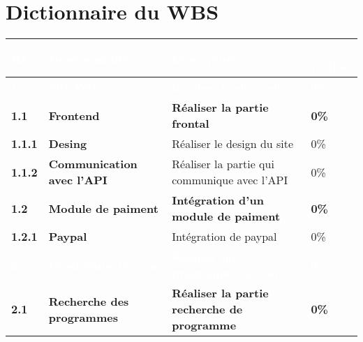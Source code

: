 \section{Dictionnaire du WBS}
\footnotesize
\begin{supertabular}{|p{1.5cm} p{6cm}|p{5cm}|R{2cm}|}
  \hline
  \textcolor{white}{\textbf{ID}} & \textcolor{white}{\textbf{Fonctionnalité}} & \textcolor{white}{\textbf{Description}} & \textcolor{white}{\textbf{\% réalisé}} \\
  \hline
  \hline


  \textcolor{white}{\textbf{1}} & \textcolor{white}{\textbf{Site Web}} & \textcolor{white}{\textbf{Réaliser le site web}} & \textcolor{white}{\textbf{0\%}} \\
  \hline

  \textbf{1.1}  & \textbf{Frontend} & \textbf{Réaliser la partie frontal} & \textbf{0\%} \\
  \hline

  \hspace{6pt}
  \textbf{1.1.1}  & \textbf{Desing} & Réaliser le design du site & 0\% \\
  \hline

  \hspace{6pt}
  \textbf{1.1.2}  & \textbf{Communication avec l'API} & Réaliser la partie qui communique avec l'API & 0\% \\
  \hline


  \textbf{1.2}  & \textbf{Module de paiment} & \textbf{Intégration d'un module de paiment} & \textbf{0\%} \\
  \hline

  \hspace{6pt} \textbf{1.2.1}  & \textbf{Paypal} & Intégration de paypal & 0\% \\
  \hline




  \textcolor{white}{\textbf{2}}  & \textcolor{white}{\textbf{Programme de scan}} & \textcolor{white}{\textbf{Réaliser un programme de scan}} & \textcolor{white}{\textbf{0\%}} \\
  \hline

  \textbf{2.1}  & \textbf{Recherche des programmes} & \textbf{Réaliser la partie recherche de programme} & \textbf{0\%} \\
  \hline


\end{supertabular}
